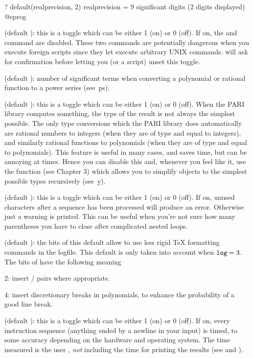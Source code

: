 \bprog
? default(realprecision, 2)
      realprecision = 9 significant digits (2 digits displayed)
@eprog

 (default ): this is a toggle which can be either 1
(on) or 0 (off). If on, the  and  command are
disabled. These two commands are potentially dangerous when you execute
foreign scripts since they let  execute arbitrary UNIX commands.
 will
ask for confirmation before letting you (or a script) unset this toggle.

 (default ): number of significant terms
when converting a polynomial or rational function to a power series
(see~\b{ps}).

 (default ): this is a toggle which can be either
1 (on) or 0 (off). When the PARI library computes something, the type of the
result is not always the simplest possible. The only type conversions which
the PARI library does automatically are rational numbers to integers (when
they are of type  and equal to integers), and similarly rational
functions to polynomials (when they are of type  and equal to
polynomials). This feature is useful in many cases, and saves time, but can
be annoying at times. Hence you can disable this and, whenever you feel like
it, use the function  (see Chapter 3) which allows you to
simplify objects to the simplest possible types recursively (see~\b{y}).

 (default ): this is a toggle which can be
either 1 (on) or 0 (off). If on, unused characters after a sequence has been
processed will produce an error. Otherwise just a warning is printed. This
can be useful when you're not sure how many parentheses you have to close after
complicated nested loops.

 (default ): the bits of this default allow
 to use less rigid TeX formatting commands in the logfile. This
default is only taken into account when ${\tt log} = 3$. The bits of
 have the following meaning

2: insert  /  pairs where appropriate.

4: insert discretionary breaks in polynomials, to enhance the probability of
a good line break.

 (default ): this is a toggle which can be either 1
(on) or 0 (off). If on, every instruction sequence (anything ended by a
newline in your input) is timed, to some accuracy depending on the hardware
and operating system. The time measured is the user ,
\emph{not} including the time for printing the results (see \kbd{\#} and
\kbd{\#\#}).

